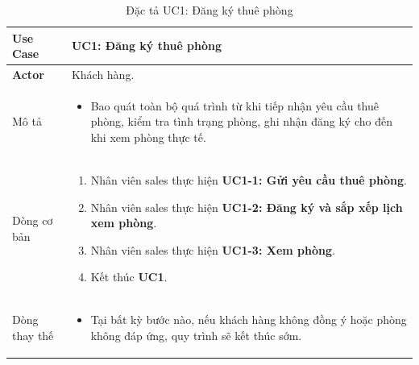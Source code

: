 \begin{table}[H]
    \centering
\begin{tabularx}{\textwidth}{|>{\centering\arraybackslash\bfseries}m{3.5cm}|X|}
    \hline
    Use Case & {\centering\textbf{UC1: Đăng ký thuê phòng}\par} \\ 
    \hline
    
    Actor & Khách hàng. \\
    \hline

    Mô tả & 
    \begin{itemize}[leftmargin=*, nosep, label=-]
        \vspace{0.2cm}
        \item Bao quát toàn bộ quá trình từ khi tiếp nhận yêu cầu thuê phòng, kiểm tra tình trạng phòng, ghi nhận đăng ký cho đến khi xem phòng thực tế.
    \end{itemize} \\ 
    \hline
    
    Dòng cơ bản & 
    \begin{enumerate}[leftmargin=*, nosep]
        \vspace{0.2cm}
        \item Nhân viên sales thực hiện \textbf{UC1-1: Gửi yêu cầu thuê phòng}.
        \item Nhân viên sales thực hiện \textbf{UC1-2: Đăng ký và sắp xếp lịch xem phòng}.
        \item Nhân viên sales thực hiện \textbf{UC1-3: Xem phòng}.
        \item Kết thúc \textbf{UC1}.
    \end{enumerate} \\ 
    \hline
    
    Dòng thay thế & 
    \begin{itemize}[leftmargin=*, nosep, label=-]
        \vspace{0.2cm}
        \item Tại bất kỳ bước nào, nếu khách hàng không đồng ý hoặc phòng không đáp ứng, quy trình sẽ kết thúc sớm.
    \end{itemize} \\ 
    \hline
\end{tabularx}
\caption{Đặc tả UC1: Đăng ký thuê phòng}
\end{table}

